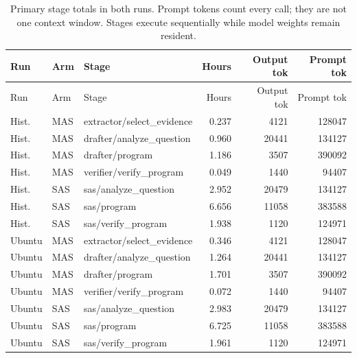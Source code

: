 \begin{longtable}{llp{}rrr}
\caption{Primary stage totals in both runs. Prompt tokens count every call; they are not one context window. Stages execute sequentially while model weights remain resident.}\label{tab:stages}\\
Run & Arm & Stage & Hours & Output tok & Prompt tok\\\toprule\endfirsthead
Run & Arm & Stage & Hours & Output tok & Prompt tok\\\toprule\endhead
Hist. & MAS & extractor/select\_evidence & 0.237 & 4121 & 128047\\
Hist. & MAS & drafter/analyze\_question & 0.960 & 20441 & 134127\\
Hist. & MAS & drafter/program & 1.186 & 3507 & 390092\\
Hist. & MAS & verifier/verify\_program & 0.049 & 1440 & 94407\\
Hist. & SAS & sas/analyze\_question & 2.952 & 20479 & 134127\\
Hist. & SAS & sas/program & 6.656 & 11058 & 383588\\
Hist. & SAS & sas/verify\_program & 1.938 & 1120 & 124971\\
Ubuntu & MAS & extractor/select\_evidence & 0.346 & 4121 & 128047\\
Ubuntu & MAS & drafter/analyze\_question & 1.264 & 20441 & 134127\\
Ubuntu & MAS & drafter/program & 1.701 & 3507 & 390092\\
Ubuntu & MAS & verifier/verify\_program & 0.072 & 1440 & 94407\\
Ubuntu & SAS & sas/analyze\_question & 2.983 & 20479 & 134127\\
Ubuntu & SAS & sas/program & 6.725 & 11058 & 383588\\
Ubuntu & SAS & sas/verify\_program & 1.961 & 1120 & 124971\\
\bottomrule\end{longtable}